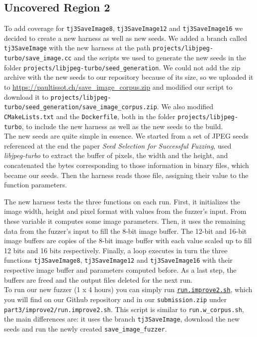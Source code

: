 \documentclass[12pt]{article}
\begin{document}
\subsection{Uncovered Region 2}
To add coverage for \texttt{tj3SaveImage8}, \texttt{tj3SaveImage12} and \texttt{tj3SaveImage16} we decided to create a new harness as well as new seeds. We added a branch called \texttt{tj3SaveImage} with the new harness at the path \texttt{projects/libjpeg-turbo/save\_image.cc} and the scripts we used to generate the new seeds in the folder \texttt{projects/libjpeg-turbo/seed\_generation}. We could not add the zip archive with the new seeds to our repository because of its size, so we uploaded it to \href{https://paultissot.ch/save_image_corpus.zip}{https://paultissot.ch/save\_image\_corpus.zip} and modified our script to download it to \texttt{projects/libjpeg-turbo/seed\_generation/save\_image\_corpus.zip}. We also modified \texttt{CMakeLists.txt} and the \texttt{Dockerfile}, both in the folder \texttt{projects/libjpeg-turbo}, to include the new harness as well as the new seeds to the build. \\


The new seeds are quite simple in essence. We started from a set of JPEG seeds referenced at the end the paper \textit{Seed Selection for Successful Fuzzing}, used \textit{libjpeg-turbo} to extract the buffer of pixels, the width and the height, and concatenated the bytes corresponding to those information in binary files, which became our seeds. Then the harness reads those file, assigning their value to the function parameters.

\noindent The new harness tests the three functions on each run. First, it initializes the image width, height and pixel format with values from the fuzzer's input. From these variable it computes some image parameters. Then, it uses the remaining data from the fuzzer's input to fill the 8-bit image buffer. The 12-bit and 16-bit image buffers are copies of the 8-bit image buffer with each value scaled up to fill 12 bits and 16 bits respectively. Finally, a loop executes in turn the three functions \texttt{tj3SaveImage8}, \texttt{tj3SaveImage12} and \texttt{tj3SaveImage16} with their respective image buffer and parameters computed before. As a last step, the buffers are freed and the output files deleted for the next run.\\


\noindent To run our new fuzzer (1 x 4 hours) you can simply run \href{https://github.com/roxannecvl/oss-fuzz/blob/main/scripts/run.improve2.sh}{\texttt{run.improve2.sh}}, which you will find on our Github repository and in our \texttt{submission.zip} under \texttt{part3/improve2/run.improve2.sh}.  This script is similar to \texttt{run.w\_corpus.sh}, the main
differences are: it uses the branch \texttt{tj3SaveImage}, download the new seeds and run the newly created
\texttt{save\_image\_fuzzer}.
\end{document}
